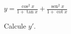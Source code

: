 \item $\displaystyle y = \frac{\cos^2 x}{1 + \tan x} + \frac{\operatorname{sen} ^2 x}{1 + \cot x}$
\par
Calcule $y'$.
